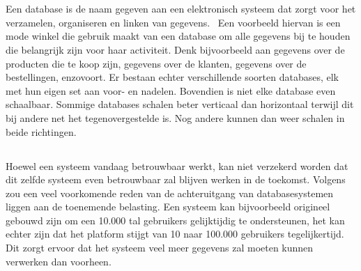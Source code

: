 \chapter{}%
\label{ch:stand-van-zaken}



\section{}%
\label{sec:wat-is-een-database}

Een database is de naam gegeven aan een elektronisch systeem dat zorgt voor het verzamelen, organiseren en linken van gegevens.~\autocite{ICTInformatiecentrum} Een voorbeeld hiervan is een mode winkel die gebruik maakt van een database om alle gegevens bij te houden die belangrijk zijn voor haar activiteit. Denk bijvoorbeeld aan gegevens over de producten die te koop zijn, gegevens over de klanten, gegevens over de bestellingen, enzovoort. Er bestaan echter verschillende soorten databases, elk met hun eigen set aan voor- en nadelen. Bovendien is niet elke database even schaalbaar. Sommige databases schalen beter verticaal dan horizontaal terwijl dit bij andere net het tegenovergestelde is. Nog andere kunnen dan weer schalen in beide richtingen.

\section{}%
\label{sec:schaalbaarheid}

Hoewel een systeem vandaag betrouwbaar werkt, kan niet verzekerd worden dat dit zelfde systeem even betrouwbaar zal blijven werken in de toekomst. Volgens~\textcite{Kleppmann2017a} zou een veel voorkomende reden van de achteruitgang van databasesystemen liggen aan de toenemende belasting. Een systeem kan bijvoorbeeld origineel gebouwd zijn om een 10.000 tal gebruikers gelijktijdig te ondersteunen, het kan echter zijn dat het platform stijgt van 10 naar 100.000 gebruikers tegelijkertijd. Dit zorgt ervoor dat het systeem veel meer gegevens zal moeten kunnen verwerken dan voorheen.

